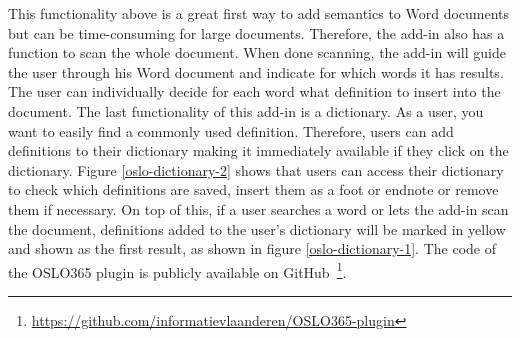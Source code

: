 \documentclass[manuscript]{acmart}
\begin{document}
This functionality above is a great first way to add semantics to Word documents but can be time-consuming for large documents. 
Therefore, the add-in also has a function to scan the whole document. 
When done scanning, the add-in will guide the user through his Word document and indicate for which words it has results. 
The user can individually decide for each word what definition to insert into the document. 
The last functionality of this add-in is a dictionary. 
As a user, you want to easily find a commonly used definition. 
Therefore, users can add definitions to their dictionary making it immediately available if they click on the dictionary. Figure \ref{oslo-dictionary-2} shows that users can access their dictionary to check which definitions are saved, insert them as a foot or endnote or remove them if necessary.
On top of this, if a user searches a word or lets the add-in scan the document, definitions added to the user's dictionary will be marked in yellow and shown as the first result, as shown in figure \ref{oslo-dictionary-1}. The code of the OSLO365 plugin is publicly available on GitHub~\footnote{\url{https://github.com/informatievlaanderen/OSLO365-plugin}}.
\end{document}

